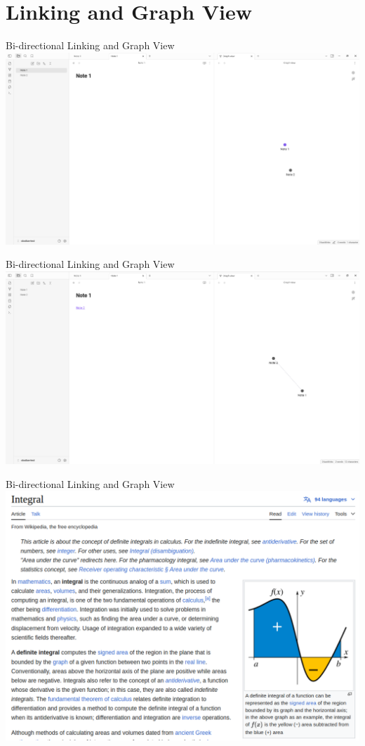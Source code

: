 \documentclass[10pt, xcolor=dvipsnames]{beamer}
\begin{document}
	\section{Linking and Graph View}
	\begin{frame}{Bi-directional Linking and Graph View}
		\centering
		\includegraphics[width=1\linewidth]{../latex-image/linking1}
	\end{frame}
	\begin{frame}{Bi-directional Linking and Graph View}
		\centering
		\includegraphics[width=1\linewidth]{../latex-image/linking2}
	\end{frame}
	\begin{frame}{Bi-directional Linking and Graph View}
	\centering
	\includegraphics[width=1\linewidth]{../latex-image/linking3}
	\end{frame}
\end{document}
